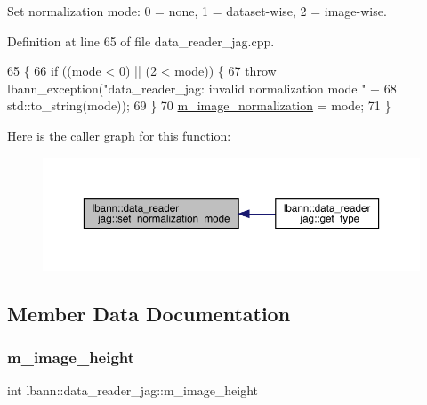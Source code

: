 Set normalization mode\+: 0 = none, 1 = dataset-\/wise, 2 = image-\/wise. 



Definition at line 65 of file data\+\_\+reader\+\_\+jag.\+cpp.


\begin{DoxyCode}
65                                                      \{
66   \textcolor{keywordflow}{if} ((mode < 0) || (2 < mode)) \{
67     \textcolor{keywordflow}{throw} lbann\_exception(\textcolor{stringliteral}{"data\_reader\_jag: invalid normalization mode "} +
68                           std::to\_string(mode));
69   \}
70   \hyperlink{classlbann_1_1data__reader__jag_a351fe7aaccf8456fa97c9d9bf3dcd73d}{m\_image\_normalization} = mode;
71 \}
\end{DoxyCode}
Here is the caller graph for this function\+:\nopagebreak
\begin{figure}[H]
\begin{center}
\leavevmode
\includegraphics[width=350pt]{classlbann_1_1data__reader__jag_a260e95eafd4e4b334cffe189db344d05_icgraph}
\end{center}
\end{figure}


\subsection{Member Data Documentation}
\mbox{\label{classlbann_1_1data__reader__jag_a6178d5dffd5e9bf7cf5703613cf9bd2e}} 
\subsubsection{\texorpdfstring{m\+\_\+image\+\_\+height}{m\_image\_height}}
{\footnotesize\ttfamily int lbann\+::data\+\_\+reader\+\_\+jag\+::m\+\_\+image\+\_\+height\hspace{0.3cm}{\ttfamily [protected]}}



